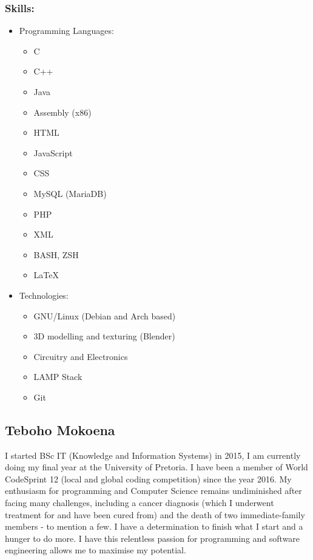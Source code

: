 \documentclass[12pt]{article}
\begin{document}
	\subsubsection{Skills:}
	\begin{itemize}
	\item Programming Languages:
	\begin{itemize}
	\item C
	\item C++
	\item Java
	\item Assembly (x86)
	\item HTML
	\item JavaScript
	\item CSS
	\item MySQL (MariaDB)
	\item PHP
	\item XML
	\item BASH, ZSH
	\item LaTeX
	\end{itemize}
	\item Technologies:
	\begin{itemize}
	\item GNU/Linux (Debian and Arch based)
	\item 3D modelling and texturing (Blender)
	\item Circuitry and Electronics
	\item LAMP Stack
	\item Git
	\end{itemize}
	\end{itemize}
	
	\subsection{Teboho Mokoena}
	I started BSc IT (Knowledge and Information Systems) in 2015, I am currently doing my final year at the University of Pretoria. I have been a member of World CodeSprint 12 (local and global coding competition) since the year 2016. My enthusiasm for programming and Computer Science remains undiminished after facing many challenges, including a cancer diagnosis (which I underwent treatment for and have been cured from) and the death of two immediate-family members - to mention a few. I have a determination to finish what I start and a hunger to do more. I have this relentless passion for programming and software engineering allows me to maximise my potential.
	
\end{document}
